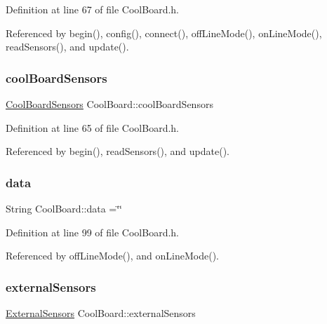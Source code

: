 Definition at line 67 of file Cool\+Board.\+h.



Referenced by begin(), config(), connect(), off\+Line\+Mode(), on\+Line\+Mode(), read\+Sensors(), and update().

\mbox{\label{classCoolBoard_af102be5288bd7f7a8e59b13f86e26a00}} 
\subsubsection{\texorpdfstring{cool\+Board\+Sensors}{coolBoardSensors}}
{\footnotesize\ttfamily \hyperlink{classCoolBoardSensors}{Cool\+Board\+Sensors} Cool\+Board\+::cool\+Board\+Sensors\hspace{0.3cm}{\ttfamily [private]}}



Definition at line 65 of file Cool\+Board.\+h.



Referenced by begin(), read\+Sensors(), and update().

\mbox{\label{classCoolBoard_a427fb753dd8575bdf821c70a5c63d695}} 
\subsubsection{\texorpdfstring{data}{data}}
{\footnotesize\ttfamily String Cool\+Board\+::data =\char`\"{}\char`\"{}\hspace{0.3cm}{\ttfamily [private]}}



Definition at line 99 of file Cool\+Board.\+h.



Referenced by off\+Line\+Mode(), and on\+Line\+Mode().

\mbox{\label{classCoolBoard_a09e26264839c65873eb56af476eff6b2}} 
\subsubsection{\texorpdfstring{external\+Sensors}{externalSensors}}
{\footnotesize\ttfamily \hyperlink{classExternalSensors}{External\+Sensors} Cool\+Board\+::external\+Sensors\hspace{0.3cm}{\ttfamily [private]}}



